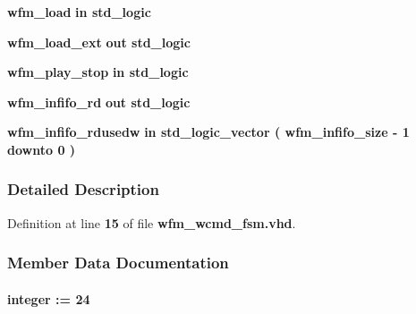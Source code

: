 \begin{DoxyCompactItemize}
\item 
{\bf wfm\+\_\+load}  {\bfseries {\bfseries \textcolor{keywordflow}{in}\textcolor{vhdlchar}{ }}} {\bfseries \textcolor{comment}{std\+\_\+logic}\textcolor{vhdlchar}{ }} 
\item 
{\bf wfm\+\_\+load\+\_\+ext}  {\bfseries {\bfseries \textcolor{keywordflow}{out}\textcolor{vhdlchar}{ }}} {\bfseries \textcolor{comment}{std\+\_\+logic}\textcolor{vhdlchar}{ }} 
\item 
{\bf wfm\+\_\+play\+\_\+stop}  {\bfseries {\bfseries \textcolor{keywordflow}{in}\textcolor{vhdlchar}{ }}} {\bfseries \textcolor{comment}{std\+\_\+logic}\textcolor{vhdlchar}{ }} 
\item 
{\bf wfm\+\_\+infifo\+\_\+rd}  {\bfseries {\bfseries \textcolor{keywordflow}{out}\textcolor{vhdlchar}{ }}} {\bfseries \textcolor{comment}{std\+\_\+logic}\textcolor{vhdlchar}{ }} 
\item 
{\bf wfm\+\_\+infifo\+\_\+rdusedw}  {\bfseries {\bfseries \textcolor{keywordflow}{in}\textcolor{vhdlchar}{ }}} {\bfseries \textcolor{comment}{std\+\_\+logic\+\_\+vector}\textcolor{vhdlchar}{ }\textcolor{vhdlchar}{(}\textcolor{vhdlchar}{ }\textcolor{vhdlchar}{ }\textcolor{vhdlchar}{ }\textcolor{vhdlchar}{ }{\bfseries {\bf wfm\+\_\+infifo\+\_\+size}} \textcolor{vhdlchar}{-\/}\textcolor{vhdlchar}{ } \textcolor{vhdldigit}{1} \textcolor{vhdlchar}{ }\textcolor{keywordflow}{downto}\textcolor{vhdlchar}{ }\textcolor{vhdlchar}{ } \textcolor{vhdldigit}{0} \textcolor{vhdlchar}{ }\textcolor{vhdlchar}{)}\textcolor{vhdlchar}{ }} 
\end{DoxyCompactItemize}


\subsubsection{Detailed Description}


Definition at line {\bf 15} of file {\bf wfm\+\_\+wcmd\+\_\+fsm.\+vhd}.



\subsubsection{Member Data Documentation}
\paragraph[{addr\+\_\+size}]{ {\bfseries \textcolor{vhdlchar}{ }} {\bfseries \textcolor{comment}{integer}\textcolor{vhdlchar}{ }\textcolor{vhdlchar}{ }\textcolor{vhdlchar}{\+:}\textcolor{vhdlchar}{=}\textcolor{vhdlchar}{ }\textcolor{vhdlchar}{ } \textcolor{vhdldigit}{24} \textcolor{vhdlchar}{ }} \hspace{0.3cm}{\ttfamily [Generic]}}\label{classwfm__wcmd__fsm_aafb0d946e5259c516e95eed0224fc8e6}


